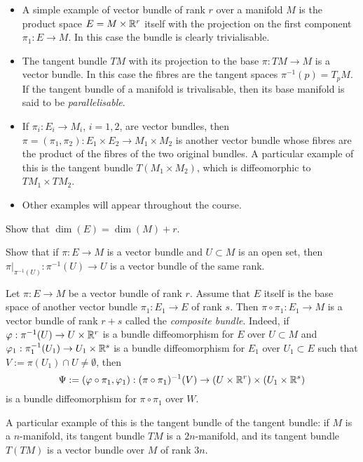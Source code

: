 \begin{example}
  \begin{itemize}
    \item A simple example of vector bundle of rank $r$ over a manifold $M$ is the product space $E = M\times \mathbb{R}^r$ itself with the projection on the first component $\pi_1: E\to M$.
    In this case the bundle is clearly trivialisable.
    \item The tangent bundle $TM$ with its projection to the base $\pi:TM\to M$ is a vector bundle.
    In this case the fibres are the tangent spaces $\pi^{-1}(p) = T_pM$. 
    If the tangent bundle of a manifold is trivalisable, then its base manifold is said to be \emph{parallelisable}.
    \item If $\pi_i: E_i\to M_i$, $i=1,2$, are vector bundles, then $\pi = (\pi_1, \pi_2): E_1\times E_2 \to M_1\times M_2$ is another vector bundle whose fibres are the product of the fibres of the two original bundles.
    A particular example of this is the tangent bundle $T(M_1\times M_2)$, which is diffeomorphic to $TM_1 \times TM_2$.
    \item Other examples will appear throughout the course.
  \end{itemize}
\end{example}

\begin{exercise}
  Show that $\dim(E) = \dim(M) + r$.
\end{exercise}

\begin{exercise}
  Show that if $\pi:E\to M$ is a vector bundle and $U\subset M$ is an open set, then $\pi\big|_{\pi^{-1}(U)}: \pi^{-1}(U) \to U$ is a vector bundle of the same rank.
\end{exercise}

\begin{example}
  Let $\pi:E \to M$ be a vector bundle of rank $r$.
  Assume that $E$ itself is the base space of another vector bundle $\pi_1: E_1\to E$ of rank $s$.
  Then $\pi\circ\pi_1: E_1 \to M$ is a vector bundle of rank $r+s$ called the \emph{composite bundle}. Indeed, if $\varphi:\pi^{-1}(U)\to U\times\mathbb{R}^r$ is a bundle diffeomorphism for $E$ over $U\subset M$ and $\varphi_1:\pi_1^{-1}(U_1)\to U_1\times\mathbb{R}^s$ is a bundle diffeomorphism for $E_1$ over $U_1\subset E$ such that $V := \pi(U_1)\cap U\neq \emptyset$, then
  \begin{equation}
    \Psi:=(\varphi\circ\pi_1, \varphi_1): (\pi\circ\pi_1)^{-1}(V)\to (U\times\mathbb{R}^r)\times (U_1\times\mathbb{R}^s)
  \end{equation}
  is a bundle diffeomorphism for $\pi\circ\pi_1$ over $W$.

  A particular example of this is the tangent bundle of the tangent bundle: if $M$ is a $n$-manifold, its tangent bundle $TM$ is a $2n$-manifold, and its tangent bundle $T(TM)$ is a vector bundle over $M$ of rank $3n$.
\end{example}

